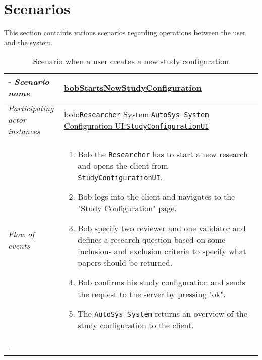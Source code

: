\section{Scenarios}
%
%
\newcommand{\researcher}{\texttt{Researcher}\xspace}
\newcommand{\configUI}{\texttt{StudyConfigurationUI}\xspace}
\newcommand{\system}{\texttt{AutoSys System}\xspace}
\newcommand{\serverside}{\texttt{Study Configuration Server}\xspace}
\newcommand{\clientside}{\texttt{Study Review UI}\xspace}
\newcommand{\studyconfig}{\texttt{Study Configuration }\xspace}
\newcommand{\user}{\texttt{User}\xspace}




This section containts various scenarios regarding operations between the user and the system.
%
%
\begin{table}[h!]
\tabulinesep=1.5mm
\begin{tabu} to 
	\tabucline[1.5pt]-
	\textit{Scenario name} & \underline{bobStartsNewStudyConfiguration} \\
	\hline
	\textit{Participating actor \newline instances} & \underline{bob:\researcher} \newline \underline{System:\system}
	\newline \underline{Configuration UI:\configUI} \\
	\hline
	\textit{Flow of events} &
	\vspace{-3mm}
	\begin{enumerate}[leftmargin=*,topsep=0pt,itemsep=-1ex]
		\item Bob the \researcher has to start a new research  and opens the client from \configUI. 
		\item Bob logs into the client and navigates to the "Study Configuration" page. 
		\item Bob specify two reviewer and one validator and defines a research question based on some inclusion- and exclusion criteria to specify what papers should be returned. 
		\item Bob confirms his study configuration and sends the request to the server by pressing "ok".
		\item The \system returns an overview of the study configuration to the client.
	\end{enumerate} \\
	\tabucline[1.5pt]-
\end{tabu}
\caption{Scenario when a user creates a new study configuration}
\label{sc:bobStartsNewStudyConfiguration}
\end{table}


